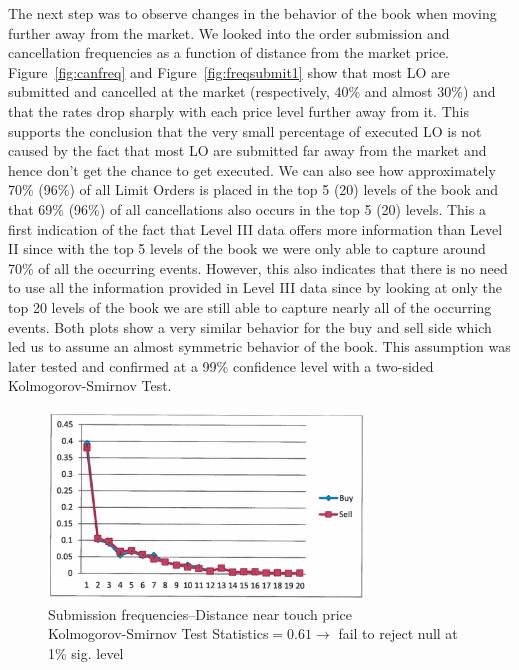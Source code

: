 The next step was to observe changes in the behavior of the book when moving further away from the market. We looked into the order submission and cancellation frequencies as a function of distance from the market price. Figure~\ref{fig:canfreq} and Figure~\ref{fig:freqsubmit1} show that most LO are submitted and cancelled at the market (respectively, 40\% and almost 30\%) and that the rates drop sharply with each price level further away from it. This supports the conclusion that the very small percentage of executed LO is not caused by the fact that most LO are submitted far away from the market and hence don't get the chance to get executed. We can also see how approximately 70\% (96\%) of all Limit Orders is placed in the top 5 (20) levels of the book and that 69\% (96\%) of all cancellations also occurs in the top 5 (20) levels. This a first indication of the fact that Level III data offers more information than Level II since with the top 5 levels of the book we were only able to capture around 70\% of all the occurring events. However, this also indicates that there is no need to use all the information provided in Level III data since by looking at only the top 20 levels of the book we are still able to capture nearly all of the occurring events. Both plots show a very similar behavior for the buy and sell side which led us to assume an almost symmetric behavior of the book. This assumption was later tested and confirmed at a 99\% confidence level with a two-sided Kolmogorov-Smirnov Test. 
	\begin{figure}[!ht]
   	\centering
   	\includegraphics[width=0.75\textwidth]{chapters/chapter_el_exch/figures/subfreqnear.png} 
   	\caption{Submission frequencies--Distance near touch price \\ Kolmogorov-Smirnov Test Statistics$=0.61 \to$ fail to reject null at 1\% sig. level \label{fig:subfreqnear}}
	\end{figure}
